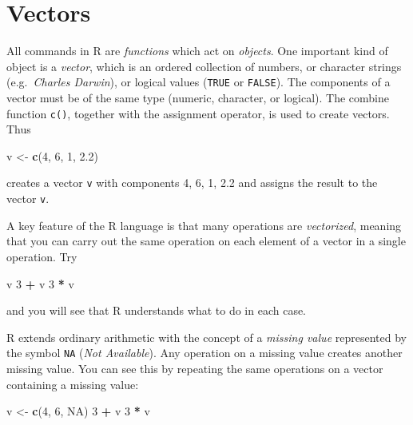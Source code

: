 \documentclass[
]{book}
\newenvironment{Shaded}{\begin{snugshade}}{\end{snugshade}}
\newcommand{\ConstantTok}[1]{\textcolor[rgb]{0.56,0.35,0.01}{#1}}
\newcommand{\DecValTok}[1]{\textcolor[rgb]{0.00,0.00,0.81}{#1}}
\newcommand{\FloatTok}[1]{\textcolor[rgb]{0.00,0.00,0.81}{#1}}
\newcommand{\FunctionTok}[1]{\textcolor[rgb]{0.13,0.29,0.53}{\textbf{#1}}}
\newcommand{\NormalTok}[1]{#1}
\newcommand{\OtherTok}[1]{\textcolor[rgb]{0.56,0.35,0.01}{#1}}
\newcommand{\SpecialCharTok}[1]{\textcolor[rgb]{0.81,0.36,0.00}{\textbf{#1}}}
\begin{document}
\section{Vectors}\label{vectors}

All commands in R are \emph{functions} which act on \emph{objects}. One
important kind of object is a \emph{vector}, which is an ordered
collection of numbers, or character strings (e.g.~\emph{Charles Darwin}),
or logical values (\texttt{TRUE} or \texttt{FALSE}). The components of a
vector must be of the same type (numeric, character, or logical). The
combine function \texttt{c()}, together with the assignment operator, is
used to create vectors. Thus

\begin{Shaded}
\begin{Highlighting}[]
\NormalTok{v }\OtherTok{\textless{}{-}} \FunctionTok{c}\NormalTok{(}\DecValTok{4}\NormalTok{, }\DecValTok{6}\NormalTok{, }\DecValTok{1}\NormalTok{, }\FloatTok{2.2}\NormalTok{)}
\end{Highlighting}
\end{Shaded}

creates a vector \texttt{v} with components 4, 6, 1, 2.2 and assigns the
result to the vector \texttt{v}.

A key feature of the R language is that many operations are \emph{vectorized},
meaning that you can carry out the same operation on
each element of a vector in a single operation. Try

\begin{Shaded}
\begin{Highlighting}[]
\NormalTok{v}
\DecValTok{3} \SpecialCharTok{+}\NormalTok{ v}
\DecValTok{3} \SpecialCharTok{*}\NormalTok{ v}
\end{Highlighting}
\end{Shaded}

and you will see that R understands what to do in each case.

R extends ordinary arithmetic with the concept of a \emph{missing value}
represented by the symbol \texttt{NA} (\emph{Not Available}). Any
operation on a missing value creates another missing value. You can
see this by repeating the same operations on a vector containing a
missing value:

\begin{Shaded}
\begin{Highlighting}[]
\NormalTok{v }\OtherTok{\textless{}{-}} \FunctionTok{c}\NormalTok{(}\DecValTok{4}\NormalTok{, }\DecValTok{6}\NormalTok{, }\ConstantTok{NA}\NormalTok{)}
\DecValTok{3} \SpecialCharTok{+}\NormalTok{ v}
\DecValTok{3} \SpecialCharTok{*}\NormalTok{ v}
\end{Highlighting}
\end{Shaded}
\end{document}
